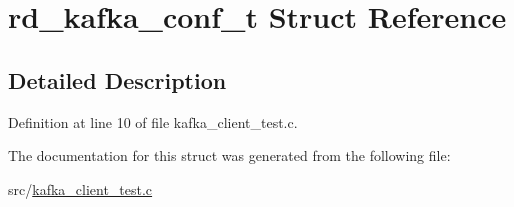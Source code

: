\hypertarget{structrd__kafka__conf__t}{\section{rd\-\_\-kafka\-\_\-conf\-\_\-t Struct Reference}
\label{structrd__kafka__conf__t}
}


\subsection{Detailed Description}


Definition at line 10 of file kafka\-\_\-client\-\_\-test.\-c.



The documentation for this struct was generated from the following file\-:\begin{DoxyCompactItemize}
\item 
src/\hyperlink{kafka__client__test_8c}{kafka\-\_\-client\-\_\-test.\-c}\end{DoxyCompactItemize}
